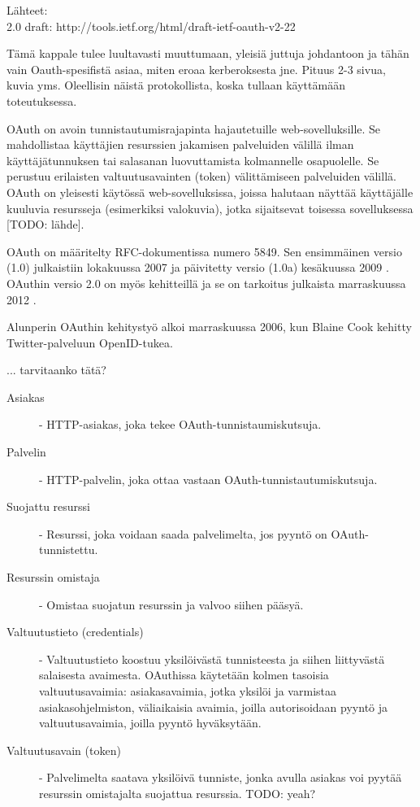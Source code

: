 Lähteet: \\
2.0 draft: http://tools.ietf.org/html/draft-ietf-oauth-v2-22 \cite{oauth2_0}

Tämä kappale tulee luultavasti muuttumaan, yleisiä juttuja johdantoon ja tähän vain Oauth-spesifistä asiaa, miten eroaa kerberoksesta jne. Pituus 2-3 sivua, kuvia yms. Oleellisin näistä protokollista, koska tullaan käyttämään toteutuksessa.

OAuth on avoin tunnistautumisrajapinta hajautetuille web-sovelluksille. Se mahdollistaa käyttäjien resurssien jakamisen palveluiden välillä ilman käyttäjätunnuksen tai salasanan luovuttamista kolmannelle osapuolelle. Se perustuu erilaisten valtuutusavainten (token) välittämiseen palveluiden välillä. OAuth on yleisesti käytössä web-sovelluksissa, joissa halutaan näyttää käyttäjälle kuuluvia resursseja (esimerkiksi valokuvia), jotka sijaitsevat toisessa sovelluksessa [TODO: lähde].

OAuth on määritelty RFC-dokumentissa numero 5849. Sen ensimmäinen versio (1.0) julkaistiin lokakuussa 2007 ja päivitetty versio (1.0a) kesäkuussa 2009 \cite{oauth2_0}. OAuthin versio 2.0 on myös kehitteillä ja se on tarkoitus julkaista marraskuussa 2012 \cite{oauth2_0}.

Alunperin OAuthin kehitystyö alkoi marraskuussa 2006, kun Blaine Cook kehitty Twitter-palveluun OpenID-tukea.

... tarvitaanko tätä?

\begin{description}
  \item[Asiakas] - HTTP-asiakas, joka tekee OAuth-tunnistaumiskutsuja.

  \item[Palvelin] - HTTP-palvelin, joka ottaa vastaan OAuth-tunnistautumiskutsuja.

  \item[Suojattu resurssi] - Resurssi, joka voidaan saada palvelimelta, jos pyyntö on OAuth-tunnistettu.

  \item[Resurssin omistaja] - Omistaa suojatun resurssin ja valvoo siihen pääsyä.

  \item[Valtuutustieto (credentials)] - Valtuutustieto koostuu yksilöivästä tunnisteesta ja siihen liittyvästä salaisesta avaimesta. OAuthissa käytetään kolmen tasoisia valtuutusavaimia: asiakasavaimia, jotka yksilöi ja varmistaa asiakasohjelmiston, väliaikaisia avaimia, joilla autorisoidaan pyyntö ja valtuutusavaimia, joilla pyyntö hyväksytään.

  \item[Valtuutusavain (token)] - Palvelimelta saatava yksilöivä tunniste, jonka avulla asiakas voi pyytää resurssin omistajalta suojattua resurssia. TODO: yeah?
\end{description}
